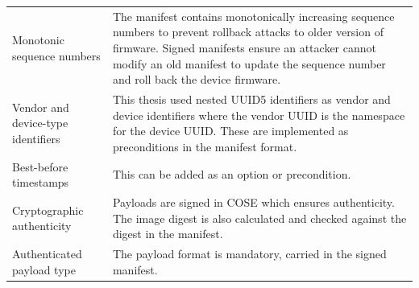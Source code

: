 \documentclass[0-thesis.tex]{subfiles}
\begin{document}
\begin{small}
\begin{longtable}[]{@{}ll@{}}
    \begin{minipage}[t]{0.37\columnwidth}\raggedright\strut
    Monotonic sequence numbers\strut
    \end{minipage} & \begin{minipage}[t]{0.57\columnwidth}\raggedright\strut
    The manifest contains monotonically increasing sequence numbers to
    prevent rollback attacks to older version of firmware. Signed manifests
    ensure an attacker cannot modify an old manifest to update the
    sequence number and roll back the device firmware.\strut
    \end{minipage}\tabularnewline
    \begin{minipage}[t]{0.37\columnwidth}\raggedright\strut
    Vendor and device-type identifiers\strut
    \end{minipage} & \begin{minipage}[t]{0.57\columnwidth}\raggedright\strut
    This thesis used nested UUID5 identifiers as vendor and device
    identifiers where the vendor UUID is the namespace for the device UUID.
    These are implemented as preconditions in the manifest format.\strut
    \end{minipage}\tabularnewline
    \begin{minipage}[t]{0.37\columnwidth}\raggedright\strut
    Best-before timestamps\strut
    \end{minipage} & \begin{minipage}[t]{0.57\columnwidth}\raggedright\strut
    This can be added as an option or precondition.\strut
    \end{minipage}\tabularnewline
    \begin{minipage}[t]{0.37\columnwidth}\raggedright\strut
    Cryptographic authenticity\strut
    \end{minipage} & \begin{minipage}[t]{0.57\columnwidth}\raggedright\strut
    Payloads are signed in COSE which ensures authenticity. The image digest
    is also calculated and checked against the digest in the manifest.\strut
    \end{minipage}\tabularnewline
    \begin{minipage}[t]{0.37\columnwidth}\raggedright\strut
    Authenticated payload type\strut
    \end{minipage} & \begin{minipage}[t]{0.57\columnwidth}\raggedright\strut
    The payload format is mandatory, carried in the signed manifest.\strut
    \end{minipage}\tabularnewline

\end{longtable}
\end{small}
\end{document}
